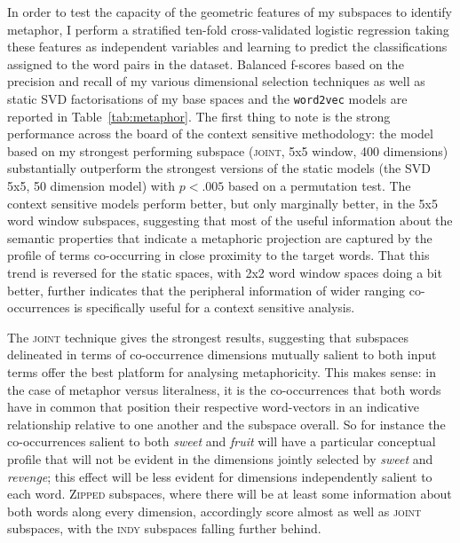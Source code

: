 In order to test the capacity of the geometric features of my subspaces to identify metaphor, I perform a stratified ten-fold cross-validated logistic regression taking these features as independent variables and learning to predict the classifications assigned to the word pairs in the dataset.  Balanced f-scores based on the precision and recall of my various dimensional selection techniques as well as static SVD factorisations of my base spaces and the \texttt{word2vec} models are reported in Table~\ref{tab:metaphor}.  The first thing to note is the strong performance across the board of the context sensitive methodology: the model based on my strongest performing subspace (\textsc{joint}, 5x5 window, 400 dimensions) substantially outperform the strongest versions of the static models (the SVD 5x5, 50 dimension model) with $p < .005$ based on a permutation test.  The context sensitive models perform better, but only marginally better, in the 5x5 word window subspaces, suggesting that most of the useful information about the semantic properties that indicate a metaphoric projection are captured by the profile of terms co-occurring in close proximity to the target words.  That this trend is reversed for the static spaces, with 2x2 word window spaces doing a bit better, further indicates that the peripheral information of wider ranging co-occurrences is specifically useful for a context sensitive analysis.

The \textsc{joint} technique gives the strongest results, suggesting that subspaces delineated in terms of co-occurrence dimensions mutually salient to both input terms offer the best platform for analysing metaphoricity.  This makes sense: in the case of metaphor versus literalness, it is the co-occurrences that both words have in common that position their respective word-vectors in an indicative relationship relative to one another and the subspace overall.  So for instance the co-occurrences salient to both \emph{sweet} and \emph{fruit} will have a particular conceptual profile that will not be evident in the dimensions jointly selected by \emph{sweet} and \emph{revenge}; this effect will be less evident for dimensions independently salient to each word.  \textsc{Zipped} subspaces, where there will be at least some information about both words along every dimension, accordingly score almost as well as \textsc{joint} subspaces, with the \textsc{indy} subspaces falling further behind.

